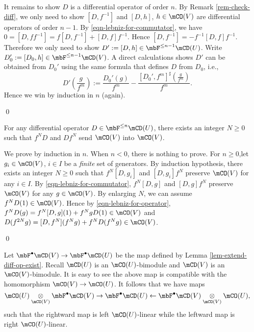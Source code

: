 		It remains to show $D$ is a differential operator of order $n$. By Remark \ref{rem-check-diff}, we only need to show $[D,f^{-1}]$ and $[D,h]$, $h\in \mCO(V)$ are differential operators of order $n-1$. By \eqref{eqn-lebniz-for-commutator}, we have $0 = [D, f f^{-1}] = f [D, f^{-1}] + [D,f] f^{-1}$. Hence $[D, f^{-1}] = -f^{-1} [D,f] f^{-1}$. Therefore we only need to show $D':=[D,h]\in \mbF^{\le n-1} \mCD(U)$. Write $D'_0:=[D_0,h] \in  \mbF^{\le n-1} \mCD(V)$. A direct calculations shows $D'$ can be obtained from $D_0'$ using the same formula that defines $D$ from $D_0$, i.e.,
		\[
			D'(\frac{g}{f^m}) := \frac{D_0'(g)}{f^m} - \frac{[D_0',f^m]^\sharp(  \frac{g}{f^m})}{f^m}.
		\]
		Hence we win by induction in $n$ (again).

	\qed

	

	\begin{lem}
		\label{lem-uniform-bound-integral}
		For any differential operator $D \in \mbF^{\le n}\mCD(U)$, there exists an integer $N\ge 0$ such that $f^ND$ and $Df^N$ send $\mCO(V)$ into $\mCO(V)$.
	\end{lem}

	\proof
		We prove by induction in $n$. When $n<0$, there is nothing to prove. For $n\ge 0$,let $g_i\in \mCO(V)$, $i\in I$ be a \emph{finite} set of generators. By induction hypothesis, there exists an integer $N\ge 0$ such that $f^N[D,g_i]$ and $[D,g_i]f^N$ preserve $\mCO(V)$ for any $i\in I$. By \eqref{eqn-lebniz-for-commutator}, $f^N[D,g]$ and $[D,g]f^N$ preserve $\mCO(V)$ for any $g\in \mCO(V)$. By enlarging $N$, we can assume $f^N D(1) \in \mCO(V)$. Hence by \eqref{eqn-lebniz-for-operator}, $f^N D(g) = f^N[D,g](1)+ f^N g D(1) \in \mCO(V)$ and $D(f^{2N}g) = [D,f^N](f^N g) + f^{N} D(f^N g)\in \mCO(V)$.

	\qed

	\begin{constr}
		\label{constr-qc-diff}
		Let $\mbF^\bullet \mCD(V) \to \mbF^\bullet \mCD(U)$ be the map defined by Lemma \ref{lem-extend-diff-op-exist}. Recall $\mCD(U)$ is an $\mCO(U)$-bimodule and $\mCD(V)$ is an $\mCO(V)$-bimodule. It is easy to see the above map is compatible with the homomorphism $\mCO(V) \to \mCO(U)$. It follows that we have maps
		\begin{equation}
			\label{eqn-D-local}
			\mCO(U) \ot_{\mCO(V)} \mbF^\bullet\mCD(V) \to \mbF^\bullet\mCD(U) \gets \mbF^\bullet \mCD(V) \ot_{\mCO(V)} \mCO(U),
		\end{equation}
		such that the rightward map is left $\mCO(U)$-linear while the leftward map is right $\mCO(U)$-linear.
	\end{constr}

